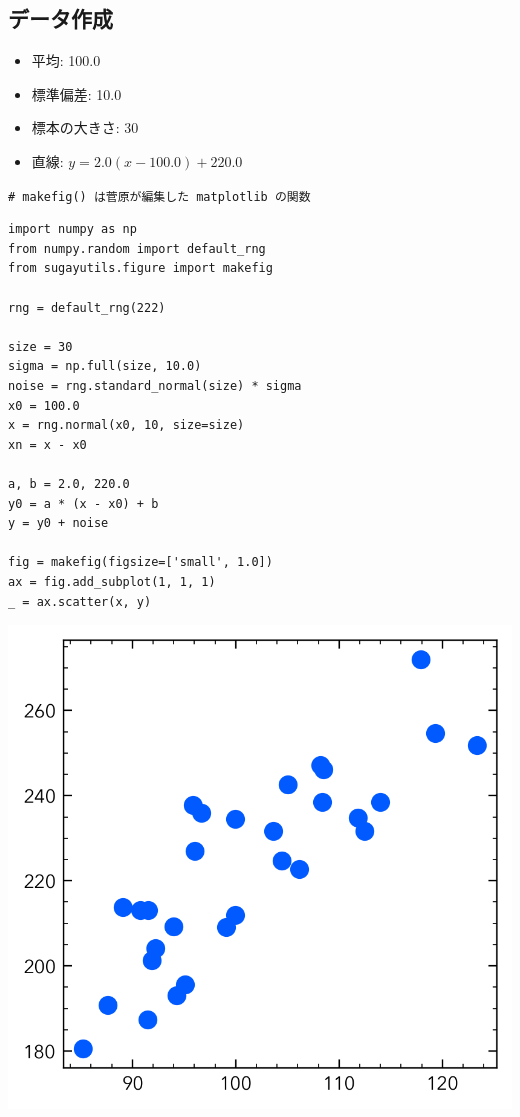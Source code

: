 \documentclass[a4paper, 8pt, notitlepage, uplatex, dvipdfmx]{jsarticle}
\begin{document}
\subsection{データ作成}
\label{sec:org6ab1a8c}
\begin{itemize}
\item 平均: 100.0
\item 標準偏差: 10.0
\item 標本の大きさ: 30
\item 直線: \(y = 2.0 (x - 100.0) + 220.0\)
\end{itemize}
\texttt{\# makefig() は菅原が編集した matplotlib の関数}
\begin{verbatim}
import numpy as np
from numpy.random import default_rng
from sugayutils.figure import makefig

rng = default_rng(222)

size = 30
sigma = np.full(size, 10.0)
noise = rng.standard_normal(size) * sigma
x0 = 100.0
x = rng.normal(x0, 10, size=size)
xn = x - x0

a, b = 2.0, 220.0
y0 = a * (x - x0) + b
y = y0 + noise

fig = makefig(figsize=['small', 1.0])
ax = fig.add_subplot(1, 1, 1)
_ = ax.scatter(x, y)
\end{verbatim}

\label{}
\begin{center}
\includegraphics[width=1.0\linewidth]{./obipy-resources/data.png}
\end{center}
\end{document}
